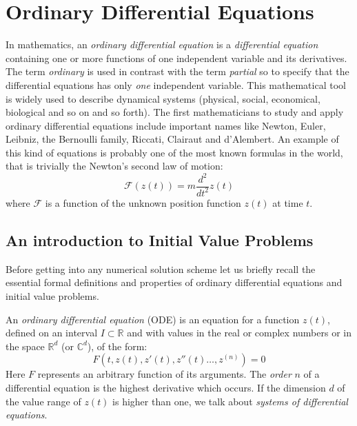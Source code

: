 %
%

\chapter{Ordinary Differential Equations}
\label{ODEs}
In mathematics, an \textit{ordinary differential equation} is a \textit{differential equation} containing one or more functions of one independent variable and its derivatives. The term \textit{ordinary} is used in contrast with the term \textit{partial} so to specify that the differential equations has only \textit{one} independent variable. This mathematical tool is widely used to describe dynamical systems (physical, social, economical, biological and so on and so forth). The first mathematicians to study and apply ordinary differential equations include important names like Newton, Euler, Leibniz, the Bernoulli family, Riccati, Clairaut and d'Alembert. An example of this kind of equations is probably one of the most known formulas in the world, that is trivially the Newton's second law of motion:
\begin{equation}
\mathcal{F}(z(t))=m\dfrac{d^2}{dt^2}z(t)
\end{equation}
where $\mathcal{F}$ is a function of the unknown position function $z(t)$ at time $t$.

\section{An introduction to Initial Value Problems}
Before getting into any numerical solution scheme let us briefly recall the essential formal definitions and properties of ordinary differential equations and initial value problems.

\begin{definition}
	An \textit{ordinary differential equation} (ODE) is an equation for a function $z(t)$, defined on an interval $I \subset \mathbb{R}$ and with values in the real or complex numbers or in the space $\mathbb{R}^d$ (or $\mathbb{C}^d$), of the form:
	\begin{equation}
		F\left(t,z(t),z'(t),z''(t)\dots,z^{(n)}\right) = 0
	\end{equation}
	Here $F$ represents an arbitrary function of its arguments. The \textit{order} $n$ of a differential equation is the highest derivative which occurs. If the dimension $d$ of the value range of $z(t)$ is higher than one, we talk about \textit{systems of differential equations}.
\end{definition}

